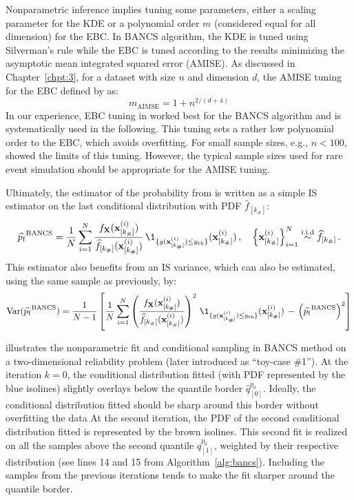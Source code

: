 Nonparametric inference implies tuning some parameters, either a scaling parameter for the KDE or a polynomial order $m$ (considered equal for all dimension) for the EBC. 
In BANCS algorithm, the KDE is tuned using Silverman's rule  while the EBC is tuned according to the results minimizing the asymptotic mean integrated squared error (AMISE). 
As discussed in Chapter~\ref{chpt:3}, for a dataset with size $n$ and dimension $d$, the AMISE tuning for the EBC defined by \citet{sancetta_satchell_2004} as:
\begin{equation}\label{eq:amise_tuning}
    m_{\mathrm{AIMSE}} = 1 + n^{2/(d+4)}
\end{equation}
In our experience, EBC tuning in  worked best for the BANCS algorithm and is systematically used in the following. 
This tuning sets a rather low polynomial order to the EBC, which avoids overfitting. 
For small sample sizes, e.g., $n<100$, \citet{segers_2017} showed the limits of this tuning. 
However, the typical sample sizes used for rare event simulation should be appropriate for the AMISE tuning. 

Ultimately, the estimator of the probability from  is written as a simple IS estimator on the last conditional distribution with PDF $\widehat{f}_{[k_\#]}$:
\begin{equation}
    \widehat{\pf}^{\mathrm{BANCS}} = \frac1N \sum_{i=1}^N \frac{f_\bX(\bx_{[k_\#]}^{(i)})}{\widehat{f}_{[k_\#]}(\bx_{[k_\#]}^{(i)})} \, \1_{\{g(\bx_{[k_\#]}^{(i)}) \leq \yth \}}(\bx_{[k_\#]}^{(i)})\, , \quad \left\{\bx_{[k_\#]}^{(i)}\right\}_{i=1}^N  \overset{\text{i.i.d}}{\sim} \widehat{f}_{[k_\#]} \, .
\end{equation}
This estimator also benefits from an IS variance, which can also be estimated, using the same sample as previously, by:
\begin{equation}
    \var(\widehat{\pf}^{\mathrm{BANCS}}) = \frac{1}{N-1} \left[\frac1N \sum_{i=1}^N \left(\frac{f_\bX(\bx_{[k_\#]}^{(i)})}{\widehat{f}_{[k_\#]}(\bx_{[k_\#]}^{(i)})}\right)^2 \, \1_{\{g(\bx_{[k_\#]}^{(i)}) \leq \yth \}}(\bx_{[k_\#]}^{(i)}) \, - \, \left(\widehat{\pf}^{\mathrm{BANCS}}\right)^2\right]
\end{equation}

 illustrates the nonparametric fit and conditional sampling in BANCS method on a two-dimensional reliability problem (later introduced as ``toy-case \#1''). 
At the iteration $k=0$, the conditional distribution fitted (with PDF represented by the blue isolines) slightly overlays below the quantile border $\widehat{q}_{[0]}^{p_0}$. 
Ideally, the conditional distribution fitted should be sharp around this border without overfitting the data
At the second iteration, the PDF of the second conditional distribution fitted is represented by the brown isolines. 
This second fit is realized on all the samples above the second quantile $\widehat{q}_{[1]}^{p_0}$, weighted by their respective distribution (see lines 14 and 15 from Algorithm~\ref{alg:bancs}). 
Including the samples from the previous iterations tends to make the fit sharper around the quantile border. 


